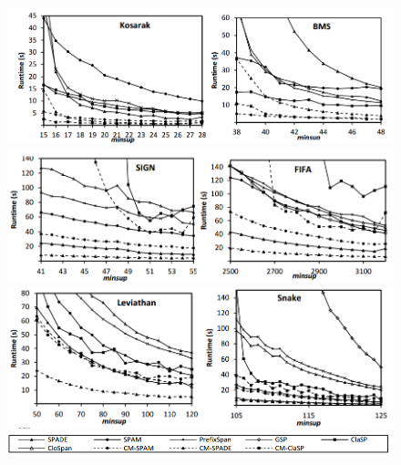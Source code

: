 \documentclass[a4paper 14pt]{article}
\begin{document}
		\begin{figure}[H]
			\includegraphics[scale = 0.5]{BMS_KOSARAK}
			\includegraphics[scale = 0.5]{FIFA_SIGN}
			\includegraphics[scale = 0.5]{SNAKE_LEVI}
			\includegraphics[scale = 0.5]{Legend}
		\end{figure}
		
\end{document}
